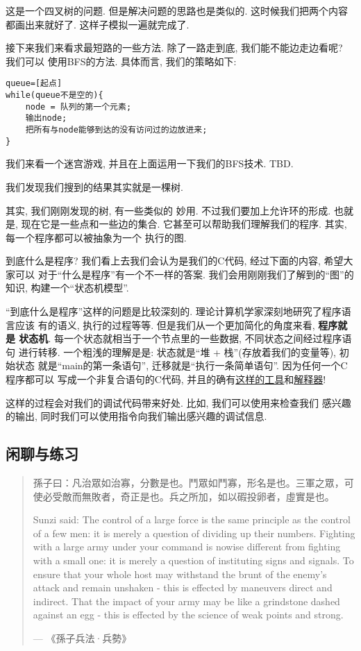  这是一个四叉树的问题. 但是解决问题的思路也是类似的. 
这时候我们把两个内容都画出来就好了. 这样子模拟一遍就完成了. 


接下来我们来看求最短路的一些方法. 除了一路走到底, 我们能不能边走边看呢? 我们可以
使用BFS的方法. 具体而言, 我们的策略如下: 
\begin{lstlisting}
queue=[起点]
while(queue不是空的){
    node = 队列的第一个元素;
    输出node;
    把所有与node能够到达的没有访问过的边放进来;
}
\end{lstlisting}

我们来看一个迷宫游戏, 并且在上面运用一下我们的BFS技术. TBD. 

我们发现我们搜到的结果其实就是一棵树. 

 其实, 我们刚刚发现的树, 有一些类似的
妙用. 不过我们要加上允许环的形成. 也就是, 现在它是一些点和一些边的集合.
它甚至可以帮助我们理解我们的程序. 其实, 每一个程序都可以被抽象为一个
执行的图. 

到底什么是程序? 我们看上去我们会认为是我们的C代码, 经过下面的内容, 希望大家可以
对于``什么是程序''有一个不一样的答案. 我们会用刚刚我们了解到的``图''的知识, 
构建一个``状态机模型''. \cite{jyyos-prog}

``到底什么是程序''这样的问题是比较深刻的. 理论计算机学家深刻地研究了程序语言应该
有的语义, 执行的过程等等. 但是我们从一个更加简化的角度来看, \textbf{程序就是
状态机}. 每一个状态就相当于一个节点里的一些数据, 不同状态之间经过程序语句
进行转移. 一个粗浅的理解是是: 状态就是``堆 + 栈''(存放着我们的变量等), 初始状态
就是``main的第一条语句'', 迁移就是``执行一条简单语句''. 因为任何一个C程序都可以
写成一个非复合语句的C代码, 并且的确有\href{https://cil-project.github.io/cil/}{这样的工具}和\href{https://gitlab.com/zsaleeba/picoc}{解释器}! 

这样的过程会对我们的调试代码带来好处. 比如, 我们可以使用来检查我们
感兴趣的输出, 同时我们可以使用指令向我们输出感兴趣的调试信息. 

\subsection*{闲聊与练习} 

\begin{quote}
    孫子曰：凡治眾如治寡，分數是也。鬥眾如鬥寡，形名是也。三軍之眾，可使必受敵而無敗者，奇正是也。兵之所加，如以碬投卵者，虛實是也。

    Sunzi said: The control of a large force is the same principle as
    the control of a few men: it is merely a question of dividing up
    their numbers. Fighting with a large army under your command is 
    nowise different from fighting with a small one: it is merely a 
    question of instituting signs and signals. To ensure that your 
    whole host may withstand the brunt of the enemy's attack and 
    remain unshaken - this is effected by maneuvers direct and 
    indirect. That the impact of your army may be like a grindstone 
    dashed against an egg - this is effected by the science of weak 
    points and strong.
    
    \hfill ---  《孫子兵法·兵勢》
\end{quote}

